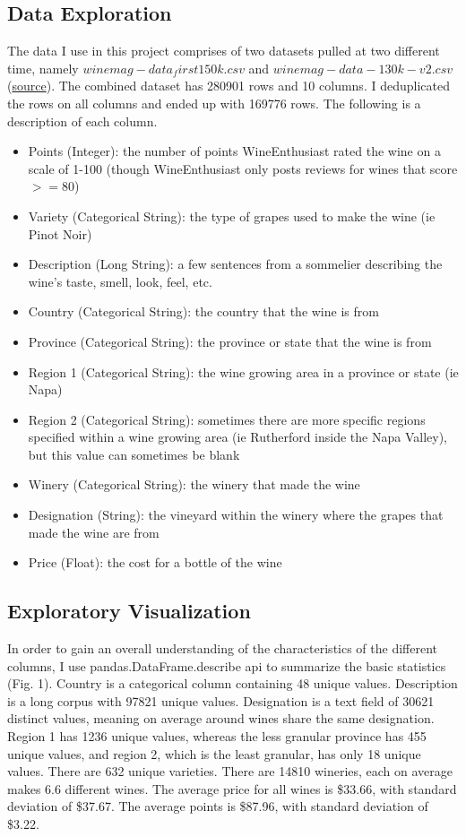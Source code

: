 \documentclass{article}
\begin{document}
\subsection{Data Exploration}
The data I use in this project comprises of two datasets pulled at two different time, namely $winemag-data_first150k.csv$ and $winemag-data-130k-v2.csv$ (\href{https://www.kaggle.com/zynicide/wine-reviews/data}{source}). The combined dataset has 280901 rows and 10 columns. I deduplicated the rows on all columns and ended up with 169776 rows. The following is a description of each column.
\begin{itemize}
  \item Points (Integer):
  the number of points WineEnthusiast rated the wine on a scale of 1-100 (though WineEnthusiast only posts reviews for wines that score $>=$80)
  \item Variety (Categorical String):
  the type of grapes used to make the wine (ie Pinot Noir)
  \item Description (Long String):
  a few sentences from a sommelier describing the wine's taste, smell, look, feel, etc.
  \item Country (Categorical String):
  the country that the wine is from
  \item Province (Categorical String):
  the province or state that the wine is from
  \item Region 1 (Categorical String):
  the wine growing area in a province or state (ie Napa)
  \item Region 2 (Categorical String):
  sometimes there are more specific regions specified within a wine growing area (ie Rutherford inside the Napa Valley), but this value can sometimes be blank
  \item Winery (Categorical String):
  the winery that made the wine
  \item Designation (String):
  the vineyard within the winery where the grapes that made the wine are from
  \item Price (Float):
  the cost for a bottle of the wine
\end{itemize}

\subsection{Exploratory Visualization}
In order to gain an overall understanding of the characteristics of the different columns, I use pandas.DataFrame.describe api to summarize the basic statistics (Fig. 1). Country is a categorical column containing 48 unique values. Description is a long corpus with 97821 unique values. Designation is a text field of 30621 distinct values, meaning on average around wines share the same designation. Region 1 has 1236 unique values, whereas the less granular province has 455 unique values, and region 2, which is the least granular, has only 18 unique values. There are 632 unique varieties. There are 14810 wineries, each on average makes 6.6 different wines. The average price for all wines is \$33.66, with standard deviation of \$37.67. The average points is \$87.96, with standard deviation of \$3.22.
\end{document}
